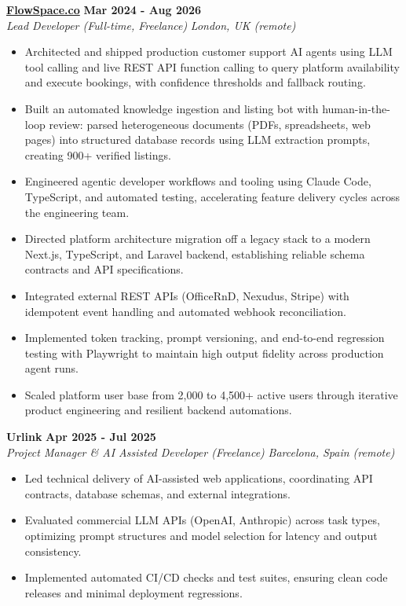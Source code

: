 \documentclass[10pt,a4paper]{article}
\newcommand{\role}[4]{%
  \textbf{#1} \hfill \textbf{#2}\\[1pt]%
  \textit{#3} \hfill \textit{#4}\\[2pt]%
}
\begin{document}
\role{\href{https://flowspace.co}{FlowSpace.co}}{Mar 2024 - Aug 2026}{Lead Developer (Full-time, Freelance)}{London, UK (remote)}
\begin{itemize}
  \item Architected and shipped production customer support AI agents using LLM tool calling and live REST API function calling to query platform availability and execute bookings, with confidence thresholds and fallback routing.
  \item Built an automated knowledge ingestion and listing bot with human-in-the-loop review: parsed heterogeneous documents (PDFs, spreadsheets, web pages) into structured database records using LLM extraction prompts, creating 900+ verified listings.
  \item Engineered agentic developer workflows and tooling using Claude Code, TypeScript, and automated testing, accelerating feature delivery cycles across the engineering team.
  \item Directed platform architecture migration off a legacy stack to a modern Next.js, TypeScript, and Laravel backend, establishing reliable schema contracts and API specifications.
  \item Integrated external REST APIs (OfficeRnD, Nexudus, Stripe) with idempotent event handling and automated webhook reconciliation.
  \item Implemented token tracking, prompt versioning, and end-to-end regression testing with Playwright to maintain high output fidelity across production agent runs.
  \item Scaled platform user base from 2,000 to 4,500+ active users through iterative product engineering and resilient backend automations.
\end{itemize}

\role{Urlink}{Apr 2025 - Jul 2025}{Project Manager \& AI Assisted Developer (Freelance)}{Barcelona, Spain (remote)}
\begin{itemize}
  \item Led technical delivery of AI-assisted web applications, coordinating API contracts, database schemas, and external integrations.
  \item Evaluated commercial LLM APIs (OpenAI, Anthropic) across task types, optimizing prompt structures and model selection for latency and output consistency.
  \item Implemented automated CI/CD checks and test suites, ensuring clean code releases and minimal deployment regressions.
\end{itemize}
\end{document}
